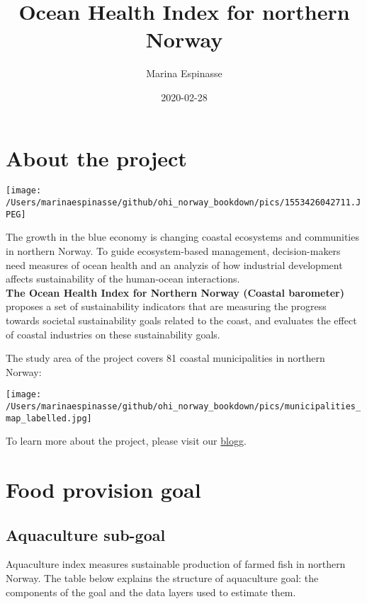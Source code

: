 \documentclass[
]{book}
\title{Ocean Health Index for northern Norway}
\author{Marina Espinasse}
\date{2020-02-28}
\begin{document}
\maketitle

{
\setcounter{tocdepth}{1}
\tableofcontents
}
\hypertarget{about-the-project}{%
\chapter{About the project}\label{about-the-project}}

\texttt{[image: /Users/marinaespinasse/github/ohi\_norway\_bookdown/pics/1553426042711.JPEG]}

The growth in the blue economy is changing coastal ecosystems and communities in northern Norway. To guide ecosystem-based management, decision-makers need measures of ocean health and an analyzis of how industrial development affects sustainability of the human-ocean interactions.\\
{\textbf{The Ocean Health Index for Northern Norway (Coastal barometer)}} proposes a set of sustainability indicators that are measuring
the progress towards societal sustainability goals related to the coast, and evaluates the effect of coastal industries on these sustainability goals.

The study area of the project covers 81 coastal municipalities in northern Norway:

\texttt{[image: /Users/marinaespinasse/github/ohi\_norway\_bookdown/pics/municipalities\_map\_labelled.jpg]}

To learn more about the project, please visit our \href{https://markdownmonster.west-wind.com/docs/_4xs10gaui.htm}{blogg}.

\hypertarget{food}{%
\chapter{Food provision goal}\label{food}}

\hypertarget{aquaculture-sub-goal}{%
\section{Aquaculture sub-goal}\label{aquaculture-sub-goal}}

Aquaculture index measures sustainable production of farmed fish in northern Norway.
The table below explains the structure of aquaculture goal: the components of the goal and the data layers used to estimate them.
\end{document}
